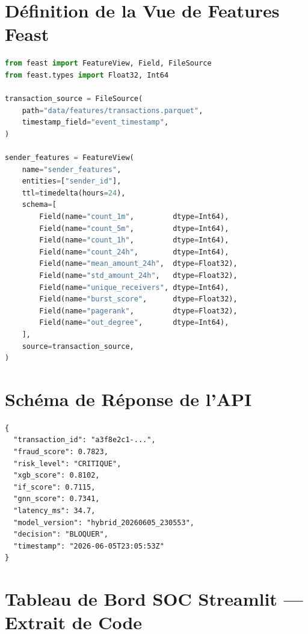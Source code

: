 \documentclass[12pt,a4paper,oneside]{book}
\theoremstyle{definition}
\theoremstyle{plain}
\begin{document}
\chapter{Définition de la Vue de Features Feast}
\label{app:feast}

\begin{lstlisting}[language=Python, caption={Extrait de la définition de la vue de features Feast.}]
from feast import FeatureView, Field, FileSource
from feast.types import Float32, Int64

transaction_source = FileSource(
    path="data/features/transactions.parquet",
    timestamp_field="event_timestamp",
)

sender_features = FeatureView(
    name="sender_features",
    entities=["sender_id"],
    ttl=timedelta(hours=24),
    schema=[
        Field(name="count_1m",         dtype=Int64),
        Field(name="count_5m",         dtype=Int64),
        Field(name="count_1h",         dtype=Int64),
        Field(name="count_24h",        dtype=Int64),
        Field(name="mean_amount_24h",  dtype=Float32),
        Field(name="std_amount_24h",   dtype=Float32),
        Field(name="unique_receivers", dtype=Int64),
        Field(name="burst_score",      dtype=Float32),
        Field(name="pagerank",         dtype=Float32),
        Field(name="out_degree",       dtype=Int64),
    ],
    source=transaction_source,
)
\end{lstlisting}

\chapter{Schéma de Réponse de l'API}
\label{app:api}

\begin{lstlisting}[language={}, caption={Exemple de réponse de scoring FastAPI.}]
{
  "transaction_id": "a3f8e2c1-...",
  "fraud_score": 0.7823,
  "risk_level": "CRITIQUE",
  "xgb_score": 0.8102,
  "if_score": 0.7115,
  "gnn_score": 0.7341,
  "latency_ms": 34.7,
  "model_version": "hybrid_20260605_230553",
  "decision": "BLOQUER",
  "timestamp": "2026-06-05T23:05:53Z"
}
\end{lstlisting}

\chapter{Tableau de Bord SOC Streamlit --- Extrait de Code}
\label{app:streamlit}
\end{document}
